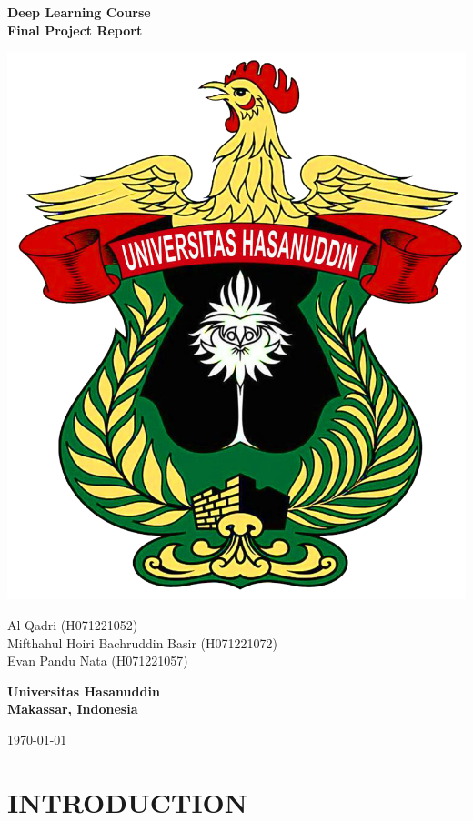 \documentclass[12pt,a4paper]{article}
\begin{document}
\begin{titlepage}
    \centering
    {\Large\textbf{Deep Learning Course \\ Final Project Report}\par} %
    \vspace{2cm} %
    \includegraphics[width=0.5\linewidth]{Images/Logo-Resmi-Unhas-2.png}\par %
    \vspace{2cm} %
    {\large
    Al Qadri (H071221052)\\ 
    Mifthahul Hoiri Bachruddin Basir (H071221072)\\ 
    Evan Pandu Nata (H071221057)\par}
    \vspace{1cm} %
    \textbf{Universitas Hasanuddin}\\
    \textbf{Makassar, Indonesia}\\[0.5cm]
    {\large\today\par} %
\end{titlepage}

\normalsize  %
\tableofcontents
\newpage

\section{INTRODUCTION}
\end{document}
